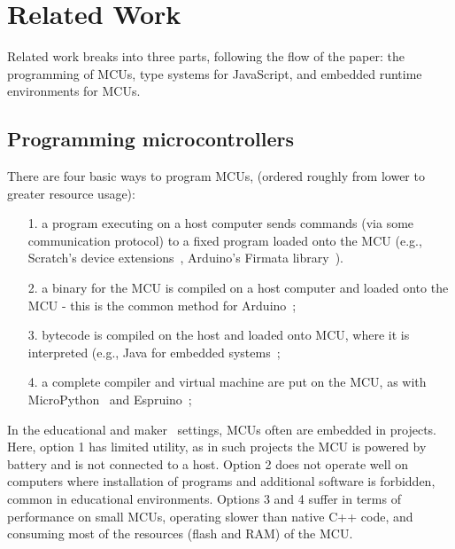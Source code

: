 \section{Related Work}
\label{sec:related}

Related work breaks into three parts, following the
flow of the paper: the programming of MCUs,
type systems for JavaScript, and embedded runtime environments
for MCUs.

\subsection{Programming microcontrollers}

There are four basic ways to program MCUs,
(ordered roughly from lower to greater resource usage):
\begin{itemize}
\item[1.] a program executing on a host computer sends commands (via some communication protocol)
to a fixed program loaded onto the MCU (e.g., Scratch's
device extensions~\cite{ScratchCACM2009}, Arduino's Firmata library~\cite{Firmata}).
\item[2.] a binary for the MCU is compiled on a host computer and loaded onto the MCU -
this is the common method for Arduino~\cite{buildingArduino2014};
\item[3.] bytecode is compiled on the host and loaded onto MCU, where it is interpreted
(e.g., Java for embedded systems~\cite{ClausenTOPLAS};
\item[4.] a complete compiler and virtual machine are put on the MCU,
as with MicroPython~\cite{MicroPython} and Espruino~\cite{espruinoBook};
\end{itemize}

In the educational and maker~\cite{dougherty2012maker} settings, MCUs often are embedded in projects. Here, option 1 has limited utility, as in such projects the MCU is powered by battery and is not connected to a host. Option 2 does not operate well on computers where installation of programs and additional software is forbidden, common in educational environments. Options 3 and 4 suffer in terms of performance on small MCUs, operating slower than native C++ code, and consuming most of the resources (flash and RAM) of the MCU.



